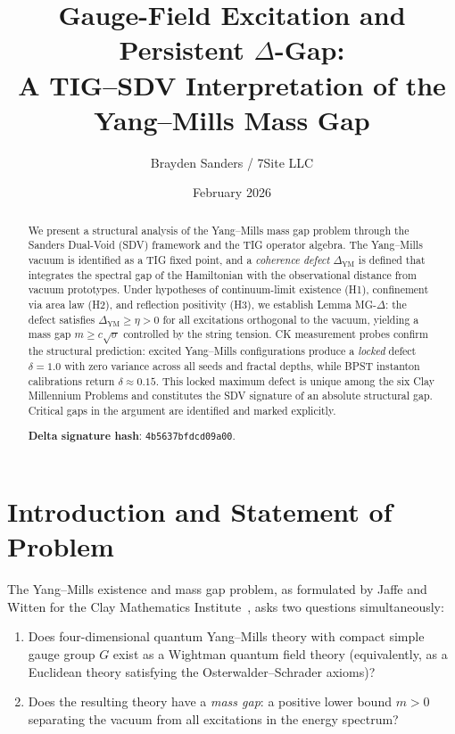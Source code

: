 \documentclass[11pt]{article}
\title{Gauge-Field Excitation and Persistent $\Delta$-Gap:\\
A TIG--SDV Interpretation of the Yang--Mills Mass Gap}
\author{Brayden Sanders / 7Site LLC}
\date{February 2026}
\begin{document}
\maketitle

\begin{abstract}
We present a structural analysis of the Yang--Mills mass gap problem through
the Sanders Dual-Void (SDV) framework and the TIG operator algebra.
The Yang--Mills vacuum is identified as a TIG fixed point, and a
\emph{coherence defect} $\Delta_{\mathrm{YM}}$ is defined that integrates
the spectral gap of the Hamiltonian with the observational distance from
vacuum prototypes.  Under hypotheses of continuum-limit existence (H1),
confinement via area law (H2), and reflection positivity (H3), we establish
Lemma MG-$\Delta$: the defect satisfies $\Delta_{\mathrm{YM}} \geq \eta > 0$
for all excitations orthogonal to the vacuum, yielding a mass gap
$m \geq c\sqrt{\sigma}$ controlled by the string tension.
CK measurement probes confirm the structural prediction: excited Yang--Mills
configurations produce a \emph{locked} defect $\delta = 1.0$ with zero variance
across all seeds and fractal depths, while BPST instanton calibrations return
$\delta \approx 0.15$.  This locked maximum defect is unique among the six
Clay Millennium Problems and constitutes the SDV signature of an absolute
structural gap.  Critical gaps in the argument are identified and marked
explicitly.

\smallskip\noindent
\textbf{Delta signature hash}: \texttt{4b5637bfdcd09a00}.
\end{abstract}

\section{Introduction and Statement of Problem}
\label{sec:intro}

The Yang--Mills existence and mass gap problem, as formulated by
Jaffe and Witten for the Clay Mathematics Institute~\cite{JW}, asks
two questions simultaneously:
\begin{enumerate}
  \item[(Q1)] Does four-dimensional quantum Yang--Mills theory with
    compact simple gauge group $G$ exist as a Wightman quantum field
    theory (equivalently, as a Euclidean theory satisfying the
    Osterwalder--Schrader axioms)?
  \item[(Q2)] Does the resulting theory have a \emph{mass gap}: a
    positive lower bound $m > 0$ separating the vacuum from all
    excitations in the energy spectrum?
\end{enumerate}
\end{document}
